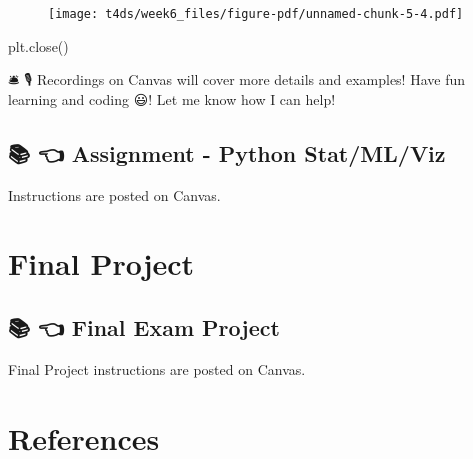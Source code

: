 \documentclass[
  letterpaper,
  DIV=11,
  numbers=noendperiod]{scrreprt}
\newenvironment{Shaded}{\begin{snugshade}}{\end{snugshade}}
\newcommand{\NormalTok}[1]{\textcolor[rgb]{0.00,0.23,0.31}{#1}}
\begin{document}
\begin{figure}[H]

{\centering \texttt{[image: t4ds/week6\_files/figure-pdf/unnamed-chunk-5-4.pdf]}

}

\end{figure}

\begin{Shaded}
\begin{Highlighting}[]
\NormalTok{plt.close()}
\end{Highlighting}
\end{Shaded}

🛎 🎙️ Recordings on Canvas will cover more details and examples! Have fun
learning and coding 😃! Let me know how I can help!

\hypertarget{assignment---python-statmlviz}{%
\section*{📚 👈 Assignment - Python
Stat/ML/Viz}\label{assignment---python-statmlviz}}


Instructions are posted on Canvas.

\hypertarget{final-project}{%
\chapter*{Final Project}\label{final-project}}


\hypertarget{final-exam-project}{%
\section*{📚 👈 Final Exam Project}\label{final-exam-project}}


Final Project instructions are posted on Canvas.

\hypertarget{references-1}{%
\chapter*{References}\label{references-1}}
\end{document}
